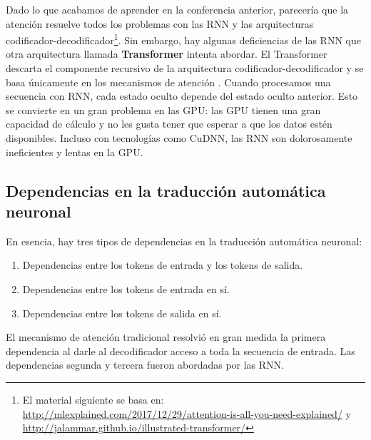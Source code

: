 Dado lo que acabamos de aprender en la conferencia anterior, parecería que la atención resuelve todos los problemas con las RNN y las arquitecturas codificador-decodificador\footnote{El material siguiente se basa en: \url{http://mlexplained.com/2017/12/29/attention-is-all-you-need-explained/} y \url{http://jalammar.github.io/illustrated-transformer/}}. Sin embargo, hay algunas deficiencias de las RNN que otra arquitectura llamada \textbf{Transformer} intenta abordar. El Transformer descarta el componente recursivo de la arquitectura codificador-decodificador y se basa únicamente en los mecanismos de atención \cite{vaswani2017attention}. Cuando procesamos una secuencia con RNN, cada estado oculto depende del estado oculto anterior. Esto se convierte en un gran problema en las GPU: las GPU tienen una gran capacidad de cálculo y no les gusta tener que esperar a que los datos estén disponibles. Incluso con tecnologías como CuDNN, las RNN son dolorosamente ineficientes y lentas en la GPU.


\subsection{Dependencias en la traducción automática neuronal}
En esencia, hay tres tipos de dependencias en la traducción automática neuronal:
\begin{enumerate}
\item Dependencias entre los tokens de entrada y los tokens de salida.
\item Dependencias entre los tokens de entrada en sí.
\item Dependencias entre los tokens de salida en sí.
\end{enumerate}

El mecanismo de atención tradicional resolvió en gran medida la primera dependencia al darle al decodificador acceso a toda la secuencia de entrada. Las dependencias segunda y tercera fueron abordadas por las RNN.

